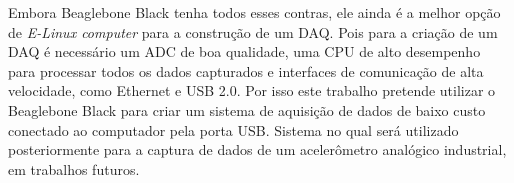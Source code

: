 Embora Beaglebone Black tenha todos esses contras, ele ainda é a melhor opção de \emph{E-Linux computer} para a construção de um DAQ. Pois para a criação de um DAQ é necessário um ADC de boa qualidade, uma CPU de alto desempenho para processar todos os dados capturados e interfaces de comunicação de alta velocidade, como Ethernet e USB 2.0. Por isso este trabalho pretende utilizar o Beaglebone Black para criar um sistema de aquisição de dados de baixo custo conectado ao computador pela porta USB. Sistema no qual será utilizado posteriormente para a captura de dados de um acelerômetro analógico industrial, em trabalhos futuros.
